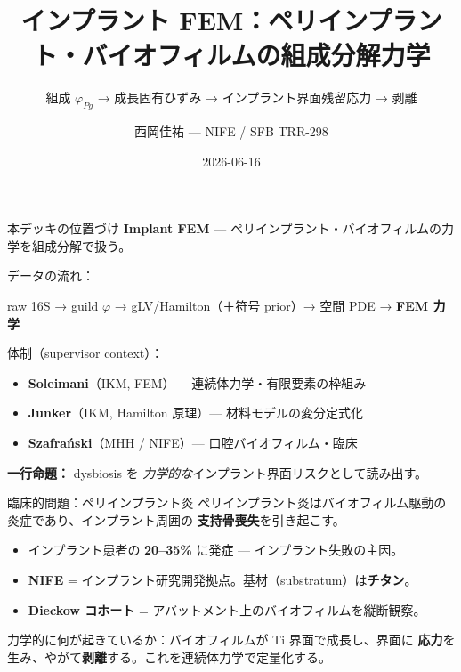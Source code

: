 \documentclass[
  ignorenonframetext,
  aspectratio=169,
]{beamer}
\title{インプラント FEM：ペリインプラント・バイオフィルムの組成分解力学}
\subtitle{組成 \(\varphi_{Pg}\) → 成長固有ひずみ →
インプラント界面残留応力 → 剥離}
\author{西岡佳祐 --- NIFE / SFB TRR-298}
\date{2026-06-16}
\providecommand{\tightlist}{%
  \setlength{\itemsep}{0pt}\setlength{\parskip}{0pt}}
\begin{document}
\frame{\titlepage}

\begin{frame}{本デッキの位置づけ}
\protect\hypertarget{ux672cux30c7ux30c3ux30adux306eux4f4dux7f6eux3065ux3051}{}
\textbf{Implant FEM} ---
ペリインプラント・バイオフィルムの力学を組成分解で扱う。

データの流れ：

raw 16S → guild \(\varphi\) → gLV/Hamilton（＋符号 prior）→ 空間 PDE →
\textbf{FEM 力学}

体制（supervisor context）：

\begin{itemize}
\tightlist
\item
  \textbf{Soleimani}（IKM, FEM）--- 連続体力学・有限要素の枠組み
\item
  \textbf{Junker}（IKM, Hamilton 原理）--- 材料モデルの変分定式化
\item
  \textbf{Szafrański}（MHH / NIFE）--- 口腔バイオフィルム・臨床
\end{itemize}

\vspace{0.4em}

\textbf{一行命題：} dysbiosis を
\emph{力学的な}インプラント界面リスクとして読み出す。
\end{frame}

\begin{frame}{臨床的問題：ペリインプラント炎}
\protect\hypertarget{ux81e8ux5e8aux7684ux554fux984cux30daux30eaux30a4ux30f3ux30d7ux30e9ux30f3ux30c8ux708e}{}
ペリインプラント炎はバイオフィルム駆動の炎症であり、インプラント周囲の
\textbf{支持骨喪失}を引き起こす。

\begin{itemize}
\tightlist
\item
  インプラント患者の \textbf{20--35\%} に発症 ---
  インプラント失敗の主因。
\item
  \textbf{NIFE} =
  インプラント研究開発拠点。基材（substratum）は\textbf{チタン}。
\item
  \textbf{Dieckow コホート} =
  アバットメント上のバイオフィルムを縦断観察。
\end{itemize}

\vspace{0.4em}

力学的に何が起きているか：バイオフィルムが Ti 界面で成長し、界面に
\textbf{応力}を生み、やがて\textbf{剥離}する。これを連続体力学で定量化する。
\end{frame}
\end{document}
